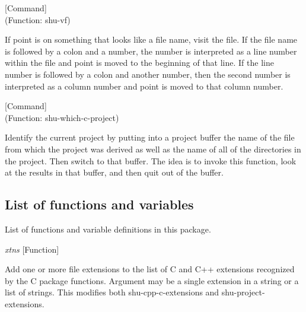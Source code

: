 \vspace{1em}
\noindent
{}
\usebox{\funcname}
 \hfill [Command]\\%
 (Function: shu-vf)

\begin{doc-string}
If point is on something that looks like a file name, visit the file.  If the
file name is followed by a colon and a number, the number is interpreted as a
line number within the file and point is moved to the beginning of that line.
If the line number is followed by a colon and another number, then the second
number is interpreted as a column number and point is moved to that column
number.
\end{doc-string}

\vspace{1em}
\noindent
{}
\usebox{\funcname}
 \hfill [Command]\\%
 (Function: shu-which-c-project)

\begin{doc-string}
Identify the current project by putting into a project buffer the name of the file
from which the project was derived as well as the name of all of the directories in the
project.  Then switch to that buffer.  The idea is to invoke this function, look at the
results in that buffer, and then quit out of the buffer.
\end{doc-string}

\subsection{List of functions and variables}

List of functions and variable definitions in this package.



\vspace{1em}
\noindent
{}
\usebox{\funcname}\emph{xtns}
 \hfill [Function]

\begin{doc-string}
Add one or more file extensions to the list of C and C++ extensions recognized by the
C package functions.  Argument may be a single extension in a string or a list of strings.
This modifies both shu-cpp-c-extensions and shu-project-extensions.
\end{doc-string}

